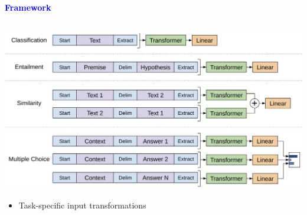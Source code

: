 \documentclass[professionalfont]{beamer}
\begin{document}
\begin{frame}

\begin{center}
    { \textbf{\textcolor{blue}{ {\fontsize{12}{14}\selectfont Framework} }} }
\end{center}
\\[0.2cm]

\includegraphics[width=1.0\linewidth]{figure/1-2.png}

\begin{itemize}
    \item Task-specific input transformations
\end{itemize}

\end{frame}
\end{document}
